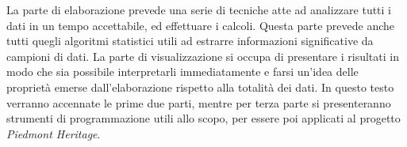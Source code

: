 La parte di elaborazione prevede una serie di tecniche atte ad analizzare tutti i dati in un tempo accettabile, ed effettuare i calcoli. Questa parte prevede anche tutti quegli algoritmi statistici utili ad estrarre informazioni significative da campioni di dati.
La parte di visualizzazione si occupa di presentare i risultati in modo che sia possibile interpretarli immediatamente e farsi un'idea delle proprietà emerse dall'elaborazione rispetto alla totalità dei dati.
In questo testo verranno accennate le prime due parti, mentre per terza parte si presenteranno strumenti di programmazione utili allo scopo, per essere poi applicati al progetto \emph{Piedmont Heritage}.